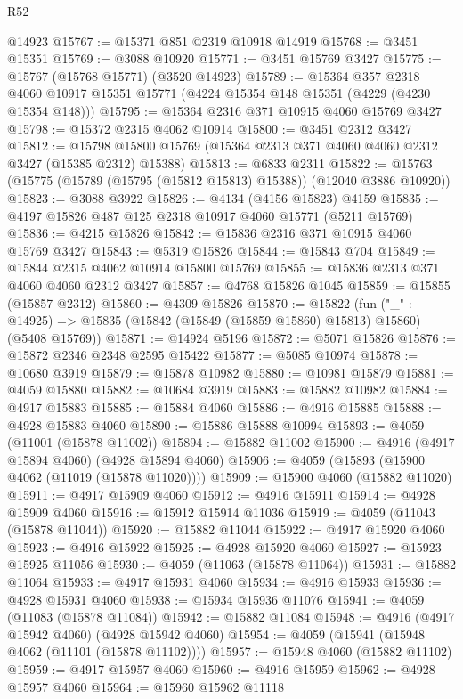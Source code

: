 \begin{lexlean}{R52}
\begin{coremodule}
    @14923
@15767 := @15371 @851 @2319 @10918 @14919
@15768 := @3451 @15351
@15769 := @3088 @10920
@15771 := @3451 @15769 @3427
@15775 := @15767 (@15768 @15771) (@3520 @14923)
@15789 := @15364
    @357
    @2318
    @4060
    @10917
    @15351
    @15771
    (@4224 @15354 @148 @15351 (@4229 (@4230 @15354 @148)))
@15795 := @15364 @2316 @371 @10915 @4060 @15769 @3427
@15798 := @15372 @2315 @4062 @10914
@15800 := @3451 @2312 @3427
@15812 := @15798 @15800 @15769 (@15364 @2313 @371 @4060 @4060 @2312 @3427 (@15385 @2312) @15388)
@15813 := @6833 @2311
@15822 := @15763 (@15775 (@15789 (@15795 (@15812 @15813) @15388)) (@12040 @3886 @10920))
@15823 := @3088 @3922
@15826 := @4134 (@4156 @15823) @4159
@15835 := @4197 @15826 @487 @125 @2318 @10917 @4060 @15771 (@5211 @15769)
@15836 := @4215 @15826
@15842 := @15836 @2316 @371 @10915 @4060 @15769 @3427
@15843 := @5319 @15826
@15844 := @15843 @704
@15849 := @15844 @2315 @4062 @10914 @15800 @15769
@15855 := @15836 @2313 @371 @4060 @4060 @2312 @3427
@15857 := @4768 @15826 @1045
@15859 := @15855 (@15857 @2312)
@15860 := @4309 @15826
@15870 := @15822
    (fun ("_" : @14925) => @15835 (@15842 (@15849 (@15859 @15860) @15813) @15860) (@5408 @15769))
@15871 := @14924 @5196
@15872 := @5071 @15826
@15876 := @15872 @2346 @2348 @2595 @15422
@15877 := @5085 @10974
@15878 := @10680 @3919
@15879 := @15878 @10982
@15880 := @10981 @15879
@15881 := @4059 @15880
@15882 := @10684 @3919
@15883 := @15882 @10982
@15884 := @4917 @15883
@15885 := @15884 @4060
@15886 := @4916 @15885
@15888 := @4928 @15883 @4060
@15890 := @15886 @15888 @10994
@15893 := @4059 (@11001 (@15878 @11002))
@15894 := @15882 @11002
@15900 := @4916 (@4917 @15894 @4060) (@4928 @15894 @4060)
@15906 := @4059 (@15893 (@15900 @4062 (@11019 (@15878 @11020))))
@15909 := @15900 @4060 (@15882 @11020)
@15911 := @4917 @15909 @4060
@15912 := @4916 @15911
@15914 := @4928 @15909 @4060
@15916 := @15912 @15914 @11036
@15919 := @4059 (@11043 (@15878 @11044))
@15920 := @15882 @11044
@15922 := @4917 @15920 @4060
@15923 := @4916 @15922
@15925 := @4928 @15920 @4060
@15927 := @15923 @15925 @11056
@15930 := @4059 (@11063 (@15878 @11064))
@15931 := @15882 @11064
@15933 := @4917 @15931 @4060
@15934 := @4916 @15933
@15936 := @4928 @15931 @4060
@15938 := @15934 @15936 @11076
@15941 := @4059 (@11083 (@15878 @11084))
@15942 := @15882 @11084
@15948 := @4916 (@4917 @15942 @4060) (@4928 @15942 @4060)
@15954 := @4059 (@15941 (@15948 @4062 (@11101 (@15878 @11102))))
@15957 := @15948 @4060 (@15882 @11102)
@15959 := @4917 @15957 @4060
@15960 := @4916 @15959
@15962 := @4928 @15957 @4060
@15964 := @15960 @15962 @11118

\end{coremodule}
\end{lexlean}
